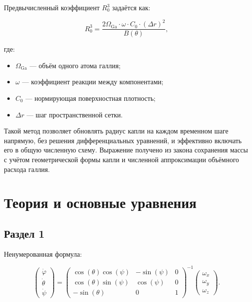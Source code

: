 \documentclass[14pt,oneside]{extarticle}
\begin{document}
Предвычисленный коэффициент $R_0^3$ задаётся как:

\begin{equation}
R_0^3 = \frac{2 \Omega_{\text{Ga}} \cdot \omega \cdot C_0 \cdot (\Delta r)^2}{B(\theta)},
\end{equation}

где:
\begin{itemize}
    \item $\Omega_{\text{Ga}}$ — объём одного атома галлия;
    \item $\omega$ — коэффициент реакции между компонентами;
    \item $C_0$ — нормирующая поверхностная плотность;
    \item $\Delta r$ — шаг пространственной сетки.
\end{itemize}

Такой метод позволяет обновлять радиус капли на каждом временном шаге напрямую, без решения дифференциальных уравнений, и эффективно включать его в общую численную схему. Выражение получено из закона сохранения массы с учётом геометрической формы капли и численной аппроксимации объёмного расхода галлия.

\pagebreak
\section{Теория и основные уравнения}

\subsection{Раздел 1}

Ненумерованная формула:

\begin{equation}
    \begin{pmatrix} \dot{\varphi}\\ \dot{\theta} \\ \dot{\psi} \end{pmatrix}
    = \begin{pmatrix}
        \cos(\theta)\cos(\psi) & -\sin(\psi) & 0 \\
        \cos(\theta)\sin(\psi) & \cos(\psi)  & 0 \\
        -\sin(\theta)         & 0         &  1
    \end{pmatrix}^{-1}
    \begin{pmatrix} \omega_x\\ \omega_y \\ \omega_z \end{pmatrix}. \nonumber
\end{equation}
\end{document}
